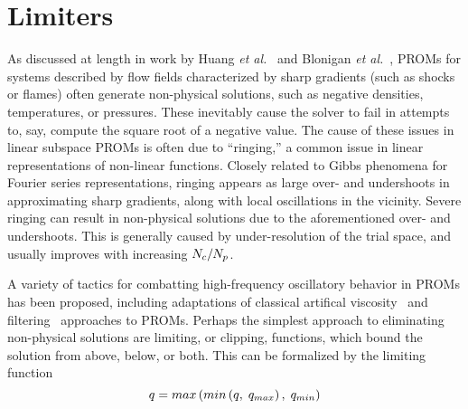 \section{Limiters}\label{sec:limiters}

As discussed at length in work by Huang \textit{et al.}~\cite{Huang2019} and Blonigan \textit{et al.}~\cite{Blonigan2020}, PROMs for systems described by flow fields characterized by sharp gradients (such as shocks or flames) often generate non-physical solutions, such as negative densities, temperatures, or pressures. These inevitably cause the solver to fail in attempts to, say, compute the square root of a negative value. The cause of these issues in linear subspace PROMs is often due to ``ringing,'' a common issue in linear representations of non-linear functions. Closely related to Gibbs phenomena for Fourier series representations, ringing appears as large over- and undershoots in approximating sharp gradients, along with local oscillations in the vicinity. Severe ringing can result in non-physical solutions due to the aforementioned over- and undershoots. This is generally caused by under-resolution of the trial space, and usually improves with increasing $N_c/N_p$.



A variety of tactics for combatting high-frequency oscillatory behavior in PROMs has been proposed, including adaptations of classical artifical viscosity~\cite{Sirisup2004,San2013} and filtering~\cite{Ardag2011,Wells2017} approaches to PROMs. Perhaps the simplest approach to eliminating non-physical solutions are limiting, or clipping, functions, which bound the solution from above, below, or both. This can be formalized by the limiting function 
%
\begin{equation}
    q = max\left(min\left(q, \; q_{max}\right), \; q_{min}\right)
\end{equation}
%

